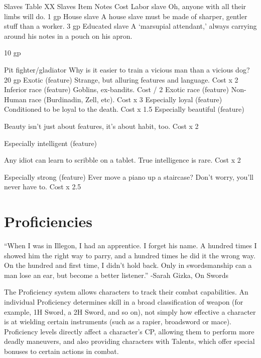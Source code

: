 \documentclass[oneside,11pt,english]{book}
\begin{document}
 


Slaves 
Table XX Slaves 
Item Notes Cost 
Labor slave Oh, anyone with all their limbs will do. 1 gp 
House slave A house slave must be made of sharper, gentler stuff than a worker. 3 gp 
Educated slave A ‘marsupial attendant,’ always carrying around his notes in a pouch on 
his apron. 

10 gp 

Pit fighter/gladiator Why is it easier to train a vicious man than a vicious dog? 20 gp 
Exotic (feature) Strange, but alluring features and language. Cost x 2 
Inferior race (feature) Goblins, ex-bandits. Cost / 2 
Exotic race (feature) Non-Human race (Burdinadin, Zell, etc). Cost x 3 
Especially loyal (feature) Conditioned to be loyal to the death. Cost x 
1.5 
Especially beautiful 
(feature) 

Beauty isn’t just about features, it’s about habit, too. Cost x 2 

Especially intelligent 
(feature) 

Any idiot can learn to scribble on a tablet. True intelligence is rare. Cost x 2 

Especially strong (feature) Ever move a piano up a staircase? Don’t worry, you’ll never have to. Cost x 
2.5 

 

 

\chapter{Proficiencies}\label{ch:proficiencies}
\startcontents[chapters]
\clearpage

“When I was in Illegon, I had an apprentice. I forget his name. A hundred times I showed him the right way to parry, and a 
hundred times he did it the wrong way. On the hundred and first time, I didn’t hold back. Only in swordsmanship can a man lose 
an ear, but become a better listener.” 
-Sarah Gizka, On Swords 
 

 

The Proficiency system allows characters to track their combat capabilities. An individual Proficiency 
determines skill in a broad classification of weapon (for example, 1H Sword, a 2H Sword, and so on), not 
simply how effective a character is at wielding certain instruments (such as a rapier, broadsword or 
mace). Proficiency levels directly affect a character’s CP, allowing them to perform more deadly 
maneuvers, and also providing characters with Talents, which offer special bonuses to certain actions in 
combat. 
\end{document}
